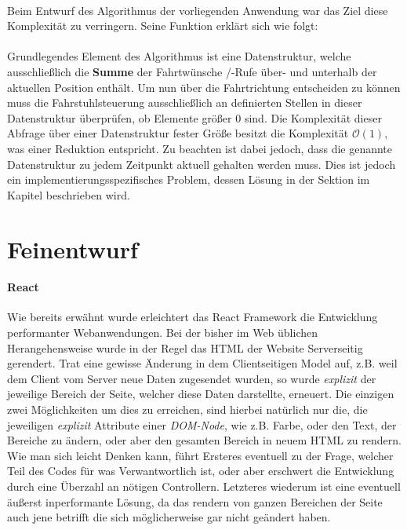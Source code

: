 \paragraph{}
Beim Entwurf des Algorithmus der vorliegenden Anwendung war das Ziel diese Komplexität zu verringern.
Seine Funktion erklärt sich wie folgt:\\ \\ Grundlegendes Element des Algorithmus ist eine Datenstruktur, welche ausschließlich die \textbf{Summe} der Fahrtwünsche /-Rufe über- und unterhalb der aktuellen Position enthält.
Um nun über die Fahrtrichtung entscheiden zu können muss die Fahrstuhlsteuerung ausschließlich an definierten Stellen in dieser Datenstruktur überprüfen, ob Elemente größer 0 sind.
Die Komplexität dieser Abfrage über einer Datenstruktur fester Größe besitzt die Komplexität $\mathcal{O}(1)$, was einer Reduktion entspricht.
Zu beachten ist dabei jedoch, dass die genannte Datenstruktur zu jedem Zeitpunkt aktuell gehalten werden muss. Dies ist jedoch ein implementierungsspezifisches Problem, dessen Lösung in der Sektion \textit{} im Kapitel \textbf{} beschrieben wird.

\section{Feinentwurf}

\paragraph{React}
Wie bereits erwähnt wurde erleichtert das React Framework die Entwicklung performanter Webanwendungen.
Bei der bisher im Web üblichen Herangehensweise wurde in der Regel das HTML der Website Serverseitig gerendert.
Trat eine gewisse Änderung in dem Clientseitigen Model auf, z.B. weil dem Client vom Server neue Daten zugesendet wurden, so wurde \textit{explizit} der jeweilige Bereich der Seite, welcher diese Daten darstellte, erneuert.
Die einzigen zwei Möglichkeiten um dies zu erreichen, sind hierbei natürlich nur die, die jeweiligen \textit{explizit} Attribute einer \textit{DOM-Node}, wie z.B. Farbe, oder den Text, der Bereiche zu ändern, oder aber den gesamten Bereich in neuem HTML zu rendern.
Wie man sich leicht Denken kann, führt Ersteres eventuell zu der Frage, welcher Teil des Codes für was Verwantwortlich ist, oder aber erschwert die Entwicklung durch eine Überzahl an nötigen Controllern.
Letzteres wiederum ist eine eventuell äußerst inperformante Lösung, da das rendern von ganzen Bereichen der Seite auch jene betrifft die sich möglicherweise gar nicht geändert haben. \\

